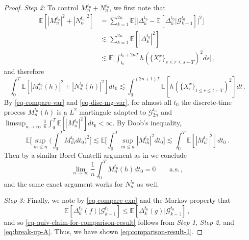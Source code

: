 \documentclass[final]{amsart}
\numberwithin{thm}{section}
\numberwithin{equation}{section}
\newcommand{\E}{\mathbb{E}}
\newcommand{\G}{\mathcal{G}}
\begin{document}
\begin{proof}
    \textit{Step 2:} To control $M_n^{t_0} + N_n^{t_0}$, we first note that 
       \begin{align*}
         \E[|M_n^{t_0}|^2 + |N_n^{t_0}|^2] &= \sum_{k=1}^{2n} \E\Big[\Big|\Delta_k^{t_0} - \E[\Delta_k^{t_0} |\G^{t_0}_{k-1}]\Big|^2\Big] \\
         &\lesssim \sum_{k=1}^{2n} \E[|\Delta_k^{t_0}|^2] \\
         &\lesssim \E\Big[\int_{t_0}^{t_0 + 2nT} h(\{X_r^x\}_{s \leq r \leq s+T})^2ds\Big] \,,
     \end{align*}  
and therefore
     \begin{equation}\label{eq-disc-mg-var}
        \int_0^T \E[|M_n^{t_0}(h)|^2 + |N_n^{t_0}(h)|^2]dt_0 \lesssim \int_0^{(2n+1)T} \E[h(\{X_r^x\}_{t \leq r \leq t+T})^2]dt \,.
     \end{equation}
     By \eqref{eq-compare-var} and \eqref{eq-disc-mg-var}, for almost all $t_0$ the discrete-time process $M_n^{t_0}(h)$ is a $L^2$ martingale adapted to $\G_{2n}^{t_0}$ and $\limsup_{n \to \infty} \frac{1}{n}\int_0^T\E[|M_n^{t_0}|^2]dt_0 < \infty$. By Doob's inequality,
     $$\E\Big[\sup_{m \leq n}\Big(\int_0^T M_m^{t_0}dt_0\Big)^2\Big] \lesssim \E\Big[\int_0^T \sup_{m \leq n}|M_m^{t_0}|^2dt_0\Big] \lesssim \int_0^T \E[|M_n^{t_0}|^2]dt_0 \,.$$
     Then by a similar Borel-Cantelli argument as in \cite[Lemma 2.12]{extinction} we conclude
     $$\lim_{n \to \infty} \frac{1}{n}\int_0^T M^{t_0}_n(h)dt_0 = 0  \qquad \textrm{a.s.} \,,$$
     and the same exact argument works for $N_n^{t_0}$ as well.
     
     \textit{Step 3:} Finally, we note by \eqref{eq-compare-exp} and the Markov property that
     $$\E[\Delta_k^{t_0}(f)|\G_{k-1}^{t_0}] \leq \E[\Delta_k^{t_0}(g)|\G_{k-1}^{t_0}] \,,$$
     and so \eqref{eq-quiv-claim-for-comparison-result} follows from \textit{Step 1, Step 2,} and \eqref{eq:break-up-A}. Thus, we have shown \eqref{eq:comparison-result-1}.


\end{proof}
\end{document}
